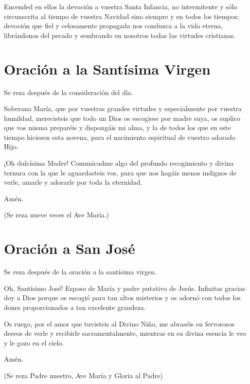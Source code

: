 \documentclass[spanish,utf8,twocolumn]{chlart}
\newenvironment{summary}{\begingroup
	\small\sffamily\itshape%
	\setlength{\leftskip}{3em}\setlength{\rightskip}{3em}\noindent
	}{\par\endgroup}
\newenvironment{lectura}{\begingroup\color{lector}}{\endgroup\par}
\newenvironment{finalnotes}{\begingroup
	\footnotesize\sffamily\color{Gray}%
	\setlength{\leftskip}{3em}\setlength{\rightskip}{3em}\noindent
	}{\par\endgroup}
\begin{document}
\begin{lectura}
Encended en ellos la devoción a vuestra Santa Infancia, no intermitente
y sólo circunscrita al tiempo de vuestra Navidad sino siempre y en todos
los tiempos; devoción que fiel y celosamente propagada nos conduzca a la
vida eterna, librándonos del pecado y sembrando en nosotros todas las
virtudes cristianas.
\end{lectura}
\newpage 
\section{Oración a la Santísima Virgen}
\begin{summary}
Se reza después de la consideración del día.
\end{summary}
\begin{lectura}
Soberana María, que por vuestras grandes virtudes y especialmente por
vuestra humildad, merecisteis que todo un Dios os escogiese por madre
suya, os suplico que vos misma preparéis y dispongáis mi alma, y la de
todos los que en este tiempo hiciesen esta novena, para el nacimiento
espiritual de vuestro adorado Hijo.

¡Oh dulcísima Madre!
Comunicadme algo del profundo recogimiento y divina ternura con la que
le aguardasteis vos, para que nos hagáis menos indignos de verle, amarle
y adorarle por toda la eternidad.

Amén.
\end{lectura}
\begin{finalnotes}
(Se reza nueve veces el Ave María.)
\end{finalnotes}

\section{Oración a San José}
\begin{summary}
Se reza después de la oración a la santísima virgen.
\end{summary}
\begin{lectura}
Oh, Santísimo José!
Esposo de María y padre putativo de Jesús.
Infinitas gracias doy a Dios porque os escogió para tan altos misterios
y os adornó con todos los dones proporcionados a tan excelente grandeza.

Os ruego, por el amor que tuvisteis al Divino Niño, me abraséis en
fervorosos deseos de verle y recibirle sacramentalmente, mientras en su
divina esencia le veo y le gozo en el cielo.

Amén.
\end{lectura}
\begin{finalnotes}
(Se reza Padre nuestro, Ave María y Gloria al Padre)
\end{finalnotes}
\end{document}
